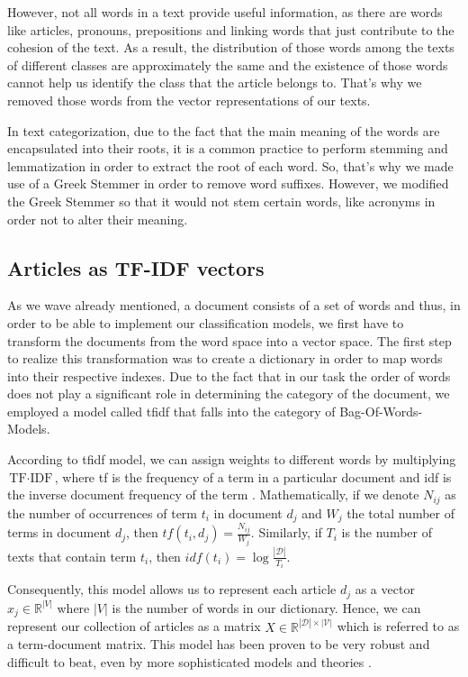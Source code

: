 \documentclass[10pt,journal,compsoc]{IEEEtran}
\begin{document}
However, not all words in a text provide useful information,
as there are words like articles, pronouns, prepositions
and linking words that just contribute to the cohesion
of the text.
As a result, the distribution of those words among
the texts of different classes are approximately
the same and the existence of those words cannot help
us identify the class that the article belongs to.
That's why we removed those words from the vector
representations of our texts.

In text categorization, due to the fact that the
main meaning of the words are encapsulated into their
roots, it is a common practice to perform stemming and
lemmatization in order to extract the root of each word.
So, that's why we made use of a Greek Stemmer in order
to remove word suffixes.
However, we modified the Greek Stemmer so that it would
not stem certain words, like acronyms in order not to
alter their meaning. 

\subsection{Articles as TF-IDF vectors}
As we wave already mentioned, a document consists of
a set of words and thus, in order to be able to
implement our classification models, we first have
to transform the documents from the word space
into a vector space.
The first step to realize this transformation was
to create a dictionary in order to map words
into their respective indexes.
Due to the fact that in our task the order of words
does not play a significant role in determining the
category of the document, we employed a model called 
tfidf that falls into the category of Bag-Of-Words-Models.
 
According to tfidf model, we can assign weights to different
words by multiplying $\text{TF}\cdot \text{IDF}$, where 
tf is the frequency of a term in a particular document and 
idf is the inverse document frequency of the term \cite{a2}.
Mathematically, if we denote $N_{ij}$ as the number of occurrences
of term $t_i$ in document $d_j$ and $W_j$ the total number
of terms in document $d_j$, then $tf(t_i,d_j) = \frac{N_{ij}}{W_j}$.
Similarly, if $T_{i}$ is the number of texts that contain term $t_i$,
then $idf(t_i) = \log\frac{|\mathcal{D}|}{T_{i}}$.

Consequently, this model allows us to represent each
article $d_j$ as a vector $x_j\in\mathbb{R}^{|V|}$ 
where $|V|$ is the number of words in our dictionary.
Hence, we can represent our collection of articles as
a matrix $X\in \mathbb{R}^{|\mathcal{D}|\times |\mathcal{V}|}$
which is referred to as a term-document matrix.
This model has been proven to be very robust and difficult
to beat, even by more sophisticated models and theories \cite{a2}.
\end{document}
